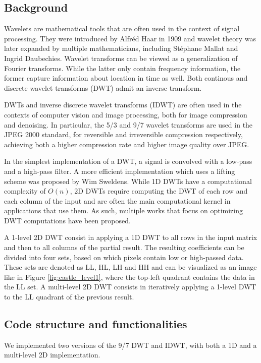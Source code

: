 \subsection{Background}
Wavelets are mathematical tools that are often used in the context of signal processing. They were introduced by Alfréd Haar in 1909\cite{haar} and wavelet theory was later expanded by multiple mathematicians, including Stéphane Mallat and Ingrid Daubechies. Wavelet transforms can be viewed as a generalization of Fourier transforms. While the latter only contain frequency information, the former capture information about location in time as well. Both continous and discrete wavelet transforms (DWT) admit an inverse transform.

DWTs and inverse discrete wavelet transforms (IDWT) are often used in the contexts of computer vision\cite{wavelet_application_4} and image processing\cite{wavelet_application_1}\cite{wavelet_application_2}, both for image compression and denoising\cite{wavelet_application_3}. In particular, the 5/3 and 9/7 wavelet transforms are used in the JPEG 2000 standard\cite{jpeg_2000}, for reversible and irreversible compression respectively, achieving both a higher compression rate and higher image quality over JPEG.

In the simplest implementation of a DWT, a signal is convolved with a low-pass and a high-pass filter. A more efficient implementation which uses a lifting scheme was proposed by Wim Sweldens\cite{lifting}. While 1D DWTs have a computational complexity of $O(n)$, 2D DWTs require computing the DWT of each row and each column of the input and are often the main computational kernel in applications that use them. As such, multiple works that focus on optimizing DWT computations have been proposed\cite{wavelet_fast_1}\cite{wavelet_fast_2}\cite{wavelet_fast_3}\cite{wavelet_fast_4}.

A 1-level 2D DWT consist in applying a 1D DWT to all rows in the input matrix and then to all columns of the partial result. The resulting coefficients can be divided into four sets, based on which pixels contain low or high-passed data. These sets are denoted as LL, HL, LH and HH and can be visualized as an image like in Figure \ref{fig:castle_level1}, where the top-left quadrant contains the data in the LL set. A multi-level 2D DWT consists in iteratively applying a 1-level DWT to the LL quadrant of the previous result.

\subsection{Code structure and functionalities}
We implemented two versions of the 9/7 DWT and IDWT, with both a 1D and a multi-level 2D implementation.

